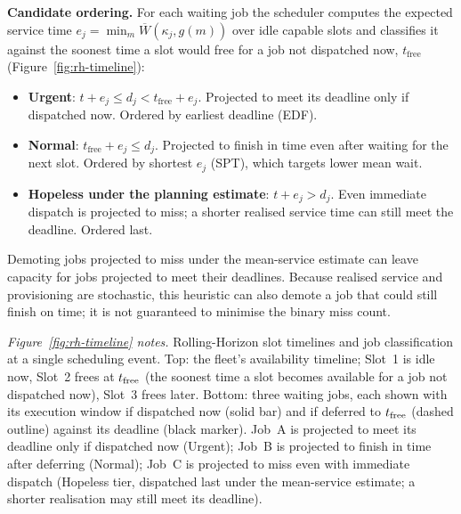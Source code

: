 \textbf{Candidate ordering.} For each waiting job the scheduler computes the expected service time $e_j = \min_{m} \overline{W}(\kappa_j, g(m))$ over idle capable slots and classifies it against the soonest time a slot would free for a job not dispatched now, $t_{\text{free}}$ (Figure~\ref{fig:rh-timeline}):
\begin{itemize}
  \item \textbf{Urgent}: $t + e_j \leq d_j < t_{\text{free}} + e_j$. Projected to meet its deadline only if dispatched now. Ordered by earliest deadline (EDF).
  \item \textbf{Normal}: $t_{\text{free}} + e_j \leq d_j$. Projected to finish in time even after waiting for the next slot. Ordered by shortest $e_j$ (SPT), which targets lower mean wait.
  \item \textbf{Hopeless under the planning estimate}: $t + e_j > d_j$. Even immediate dispatch is projected to miss; a shorter realised service time can still meet the deadline. Ordered last.
\end{itemize}
Demoting jobs projected to miss under the mean-service estimate can leave capacity for jobs projected to meet their deadlines. Because realised service and provisioning are stochastic, this heuristic can also demote a job that could still finish on time; it is not guaranteed to minimise the binary miss count.



\noindent\textit{Figure~\ref{fig:rh-timeline} notes.} Rolling-Horizon slot timelines and job classification at a single scheduling event. Top: the fleet's availability timeline; Slot~1 is idle now, Slot~2 frees at $t_{\rm free}$ (the soonest time a slot becomes available for a job not dispatched now), Slot~3 frees later. Bottom: three waiting jobs, each shown with its execution window if dispatched now (solid bar) and if deferred to $t_{\rm free}$ (dashed outline) against its deadline (black marker). Job~A is projected to meet its deadline only if dispatched now (Urgent); Job~B is projected to finish in time after deferring (Normal); Job~C is projected to miss even with immediate dispatch (Hopeless tier, dispatched last under the mean-service estimate; a shorter realisation may still meet its deadline).\par


